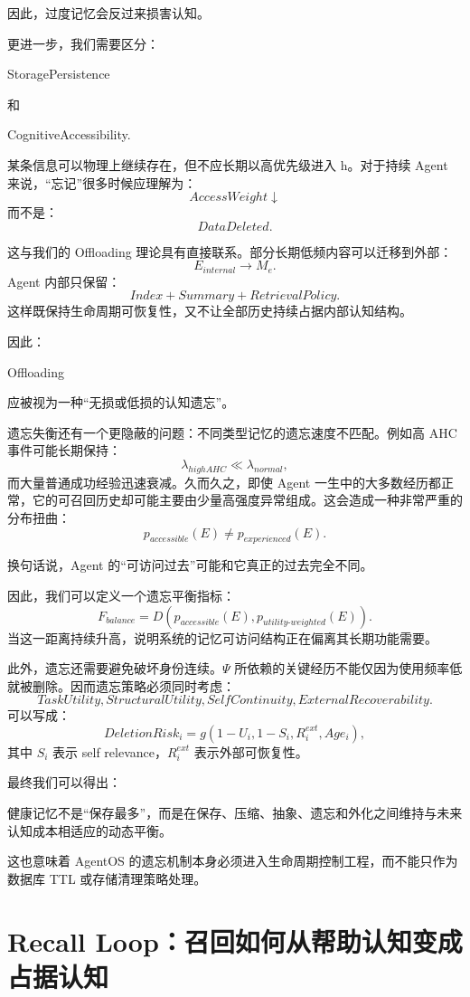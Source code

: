因此，过度记忆会反过来损害认知。

更进一步，我们需要区分：
\begin{statementbox}
StoragePersistence
\end{statementbox}
和
\begin{statementbox}
CognitiveAccessibility.
\end{statementbox}
某条信息可以物理上继续存在，但不应长期以高优先级进入 h。对于持续 Agent 来说，“忘记”很多时候应理解为：
\[
AccessWeight\downarrow
\]
而不是：
\[
DataDeleted.
\]

这与我们的 Offloading 理论具有直接联系。部分长期低频内容可以迁移到外部：
\[
E_{internal}
\rightarrow
M_e.
\]
Agent 内部只保留：
\[
Index+Summary+RetrievalPolicy.
\]
这样既保持生命周期可恢复性，又不让全部历史持续占据内部认知结构。

因此：
\begin{statementbox}
Offloading
\end{statementbox}
应被视为一种“无损或低损的认知遗忘”。

遗忘失衡还有一个更隐蔽的问题：不同类型记忆的遗忘速度不匹配。例如高 AHC 事件可能长期保持：
\[
\lambda_{highAHC}\ll\lambda_{normal},
\]
而大量普通成功经验迅速衰减。久而久之，即使 Agent 一生中的大多数经历都正常，它的可召回历史却可能主要由少量高强度异常组成。这会造成一种非常严重的分布扭曲：
\[
p_{accessible}(E)
\neq
p_{experienced}(E).
\]

换句话说，Agent 的“可访问过去”可能和它真正的过去完全不同。

因此，我们可以定义一个遗忘平衡指标：
\[
F_{balance}
=
D
\left(
p_{accessible}(E)
,
p_{utility\text{-}weighted}(E)
\right).
\]
当这一距离持续升高，说明系统的记忆可访问结构正在偏离其长期功能需要。

此外，遗忘还需要避免破坏身份连续。$\Psi$ 所依赖的关键经历不能仅因为使用频率低就被删除。因而遗忘策略必须同时考虑：
\[
TaskUtility,
StructuralUtility,
SelfContinuity,
ExternalRecoverability.
\]
可以写成：
\[
DeletionRisk_i
=
g
\left(
1-U_i,
1-S_i,
R_i^{ext},
Age_i
\right),
\]
其中 $S_i$ 表示 self relevance，$R_i^{ext}$ 表示外部可恢复性。

最终我们可以得出：
\begin{statementbox}
健康记忆不是“保存最多”，而是在保存、压缩、抽象、遗忘和外化之间维持与未来认知成本相适应的动态平衡。
\end{statementbox}

这也意味着 AgentOS 的遗忘机制本身必须进入生命周期控制工程，而不能只作为数据库 TTL 或存储清理策略处理。

\section{Recall Loop：召回如何从帮助认知变成占据认知}
\label{sec:recall-loop}

